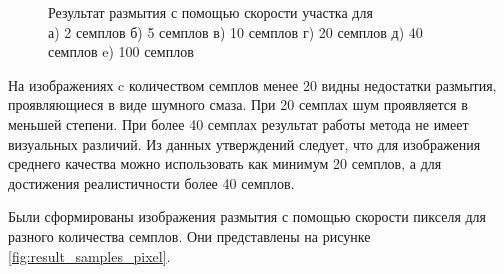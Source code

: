\begin{figure}[h]
    \begin{minipage}[h]{0.45\linewidth}
    \end{minipage}
    \hfill
    \begin{minipage}[h]{0.45\linewidth}
    \end{minipage}


    \caption{Результат размытия с помощью скорости участка для \\ а) 2 семплов б) 5 семплов  в) 10 семплов  г) 20 семплов  д) 40 семплов  e) 100 семплов }
    \label{fig:result_samples_neighbor}
\end{figure} 



На изображениях c количеством семплов менее 20 видны недостатки размытия, проявляющиеся в виде шумного смаза. При 20 семплах шум проявляется в меньшей степени. При более 40 семплах результат работы метода не имеет визуальных различий. Из данных утверждений следует, что для изображения среднего качества можно использовать как минимум 20 семплов, а для достижения реалистичности более 40 семплов.

Были сформированы изображения размытия с помощью скорости пикселя для разного количества семплов. Они представлены на рисунке \ref{fig:result_samples_pixel}.


